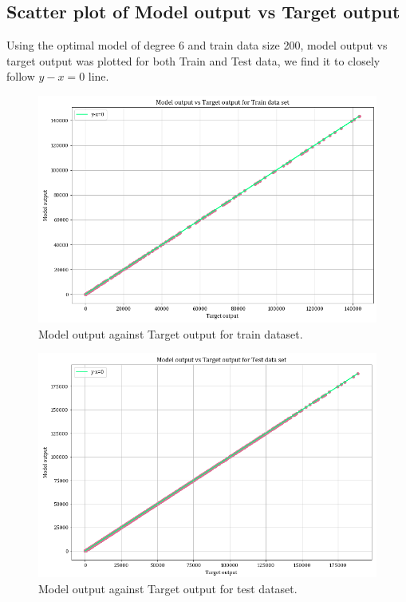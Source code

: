 \documentclass[12pt,a4paper]{article}
\begin{document}
\subsection{Scatter plot of Model output vs Target output}
Using the optimal model of degree 6 and train data size 200, model output vs target output was plotted for both Train and Test data, we find it to closely follow $y-x=0$ line.
\begin{figure}[H]
    \centering
    \includegraphics[scale=0.45]{images/tvsy_train.png}
    \caption{Model output against Target output for train dataset.}
    \label{fig:yvst}
\end{figure}

\begin{figure}[H]
    \centering
    \includegraphics[scale=0.45]{images/tvsy_test.png}
    \caption{Model output against Target output for test dataset.}
\end{figure}
\end{document}

